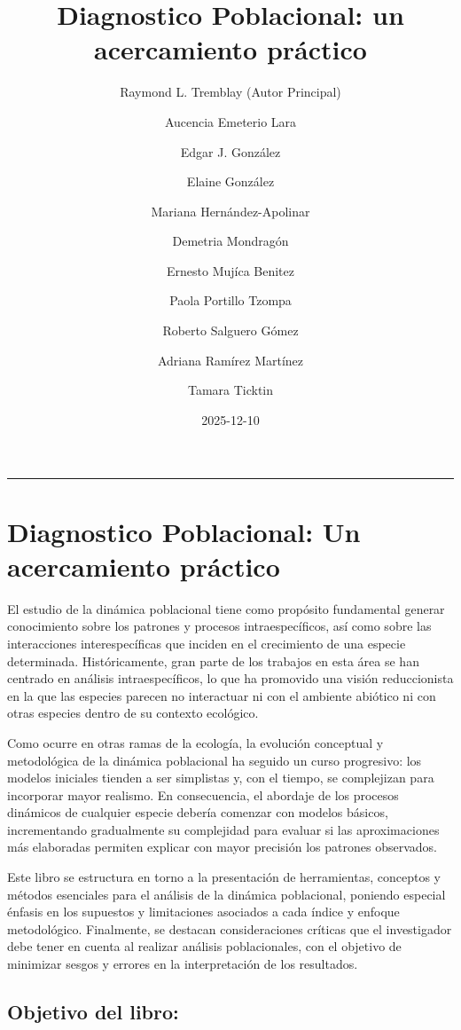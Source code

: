 \documentclass[
  12pt,
  letterpaper,
]{book}
\title{Diagnostico Poblacional: un acercamiento práctico}
\author{Raymond L. Tremblay (Autor Principal) \and Aucencia Emeterio
Lara \and Edgar J. González \and Elaine González \and Mariana
Hernández-Apolinar \and Demetria Mondragón \and Ernesto Mujíca
Benitez \and Paola Portillo Tzompa \and Roberto Salguero
Gómez \and Adriana Ramírez Martínez \and Tamara Ticktin}
\date{2025-12-10}
\renewcommand*\contentsname{Tabla de contenidos}
\newcommand\contentsname{Tabla de contenidos}
\begin{document}
\frontmatter
\maketitle

\renewcommand*\contentsname{Tabla de contenidos}
{
\hypersetup{linkcolor=}
\setcounter{tocdepth}{2}
\tableofcontents
}

\mainmatter
\begin{center}\rule{0.5\linewidth}{0.5pt}\end{center}

\chapter{Diagnostico Poblacional: Un acercamiento
práctico}\label{diagnostico-poblacional-un-acercamiento-pruxe1ctico}

El estudio de la dinámica poblacional tiene como propósito fundamental
generar conocimiento sobre los patrones y procesos intraespecíficos, así
como sobre las interacciones interespecíficas que inciden en el
crecimiento de una especie determinada. Históricamente, gran parte de
los trabajos en esta área se han centrado en análisis intraespecíficos,
lo que ha promovido una visión reduccionista en la que las especies
parecen no interactuar ni con el ambiente abiótico ni con otras especies
dentro de su contexto ecológico.

Como ocurre en otras ramas de la ecología, la evolución conceptual y
metodológica de la dinámica poblacional ha seguido un curso progresivo:
los modelos iniciales tienden a ser simplistas y, con el tiempo, se
complejizan para incorporar mayor realismo. En consecuencia, el abordaje
de los procesos dinámicos de cualquier especie debería comenzar con
modelos básicos, incrementando gradualmente su complejidad para evaluar
si las aproximaciones más elaboradas permiten explicar con mayor
precisión los patrones observados.

Este libro se estructura en torno a la presentación de herramientas,
conceptos y métodos esenciales para el análisis de la dinámica
poblacional, poniendo especial énfasis en los supuestos y limitaciones
asociados a cada índice y enfoque metodológico. Finalmente, se destacan
consideraciones críticas que el investigador debe tener en cuenta al
realizar análisis poblacionales, con el objetivo de minimizar sesgos y
errores en la interpretación de los resultados.

\section{Objetivo del libro:}\label{objetivo-del-libro}
\end{document}
